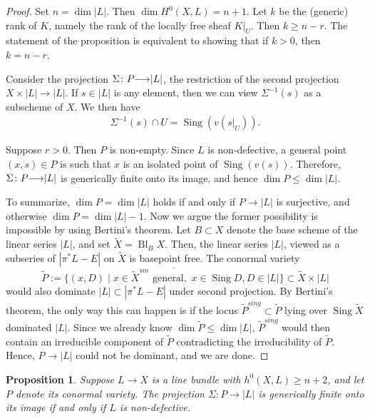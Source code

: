 \documentclass[11pt,reqno]{amsart}
\theoremstyle{plain}
\newtheorem{proposition}[theorem]{Proposition}
\theoremstyle{definition}
\theoremstyle{remark}
\numberwithin{equation}{section}
\DeclareMathOperator{\Bl}{Bl}
\DeclareMathOperator{\sing}{Sing}
\DeclareMathOperator{\dm}{dim}
\renewcommand{\to}{{\longrightarrow}}
\numberwithin{equation}{section}
\begin{document}
\begin{proof}
  Set $n = \dim |L|$.
  Then $\dim H^0(X, L) = n+1$.
  Let $k$ be the (generic) rank of $K$, namely the rank of the locally free sheaf $K|_U$.
  Then $k \geq n-r$.
  The statement of the proposition is equivalent to showing that if $k > 0$, then $k = n-r$.
    
  Consider the projection $\Sigma \from P \to |L|$, the restriction of the second projection $X \times |L| \to |L|$.
  If $s \in |L|$ is any element, then we can view $\Sigma^{-1}(s)$ as a subscheme of $X$.
  We then have
  \begin{align*}
    \Sigma^{-1}(s) \cap U = \sing(v(s|_{U})).
  \end{align*}

  Suppose $r>0$.
  Then $P$ is non-empty.
  Since $L$ is non-defective, a general point $(x,s) \in P$ is such that $x$ is an isolated point of $\sing(v(s))$.
  Therefore, $\Sigma \from P \to |L|$ is generically finite onto its image, and hence $\dim P \leq \dim |L|$.  

  To summarize, $\dm P = \dm |L|$ holds if and only if $P \to |L|$ is surjective, and otherwise $\dm P = \dm |L| -1$.  Now we argue the former possibility is impossible by using Bertini's theorem.  Let $B \subset X$ denote the base scheme of the linear series $|L|$, and set $\widetilde{X} = \Bl_{B}X$. Then, the linear series $|L|$, viewed as a subseries of $|\pi^{*}L-E|$ on $\widetilde{X}$ is basepoint free.  The conormal variety $$\widetilde{P} := \overline{\{(x,D) \mid x \in \widetilde{X}^{sm} \,\, \text{general}, \,\, x \in \sing D, D \in|L|\}} \subset \widetilde{X} \times |L|$$ would also dominate $|L| \subset |\pi^{*}L-E|$ under second projection. By Bertini's theorem, the only way this can happen is if the locus $\widetilde{P}^{sing} \subset \widetilde{P}$ lying over $\sing \widetilde{X}$ dominated $|L|$.  Since we already know $\dm \widetilde{P} \leq \dm |L|$, $\widetilde{P}^{sing}$ would then contain an irreducible component of $\widetilde{P}$ contradicting the irreducibility of $\widetilde{P}$. Hence, $P \to |L|$ could not be dominant, and we are done.

\end{proof} 

\begin{proposition}
  \label{prop:dimensionCriterion}
  Suppose $L \to X$ is a line bundle with $h^{0}(X,L) \geq n+2$, and let $P$ denote its conormal variety.  The projection $\Sigma: P \to |L|$ is generically finite onto its image if and only if $L$ is non-defective. 
\end{proposition}
\end{document}
